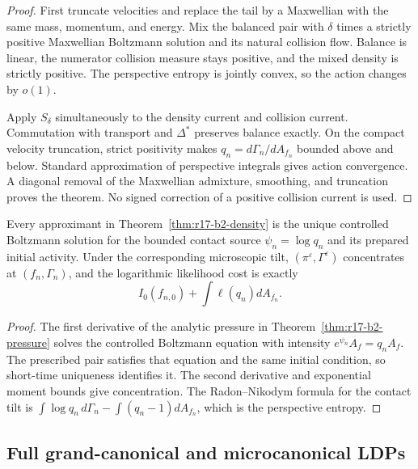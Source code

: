 \begin{proof}
First truncate velocities and replace the tail by a Maxwellian with the same
mass, momentum, and energy.  Mix the balanced pair with \(\delta\) times a
strictly positive Maxwellian Boltzmann solution and its natural collision
flow.  Balance is linear, the numerator collision measure stays positive, and
the mixed density is strictly positive.  The perspective entropy is jointly
convex, so the action changes by \(o(1)\).

Apply \(S_\delta\) simultaneously to the density current and collision
current.  Commutation with transport and \(\Delta^*\) preserves balance
exactly.  On the compact velocity truncation, strict positivity makes
\(q_n=d\Gamma_n/dA_{f_n}\) bounded above and below.  Standard approximation
of perspective integrals gives action convergence.  A diagonal removal of the
Maxwellian admixture, smoothing, and truncation proves the theorem.  No signed
correction of a positive collision current is used.
\end{proof}

\begin{theorem}
\label{thm:r17-b2-exposure}
Every approximant in Theorem~\ref{thm:r17-b2-density} is the unique controlled
Boltzmann solution for the bounded contact source
\(\psi_n=\log q_n\) and its prepared initial activity.  Under the corresponding
microscopic tilt, \((\pi^\varepsilon,\Gamma^\varepsilon)\) concentrates at
\((f_n,\Gamma_n)\), and the logarithmic likelihood cost is exactly
\[
 I_0(f_{n,0})+\int\ell(q_n)dA_{f_n}.
\]
\end{theorem}

\begin{proof}
The first derivative of the analytic pressure in
Theorem~\ref{thm:r17-b2-pressure} solves the controlled Boltzmann equation
with intensity \(e^{\psi_n}A_f=q_nA_f\).  The prescribed pair satisfies that
equation and the same initial condition, so short-time uniqueness identifies
it.  The second derivative and exponential moment bounds give concentration.
The Radon--Nikodym formula for the contact tilt is
\(\int\log q_n\,d\Gamma_n-\int(q_n-1)dA_{f_n}\), which is the perspective
entropy.
\end{proof}

\subsection{Full grand-canonical and microcanonical LDPs}


